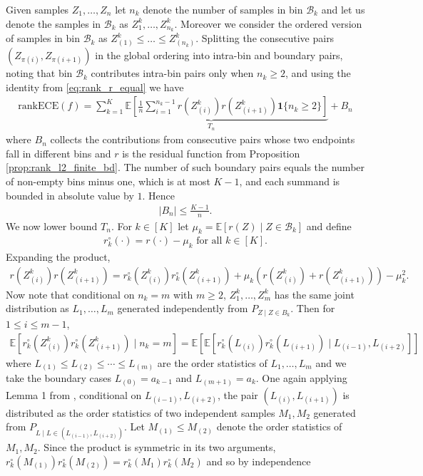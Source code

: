 \documentclass[11pt]{article}
\numberwithin{equation}{section}
\theoremstyle{definition}
\newcommand{\E}{\mathbb{E}}
\newcommand{\cB}{\mathcal{B}}
\newcommand{\one}{\bm{1}}
\newcommand{\rankECE}{\mathrm{rankECE}}
\begin{document}
Given samples $Z_1,\ldots, Z_n$ let $n_k$ denote the number of samples in bin $\cB_k$ and let us denote the samples in $\cB_k$ as $Z_{1}^{k}, \ldots, Z_{n_k}^{k}$. Moreover we consider the ordered version of samples in bin $\cB_k$ as $Z_{(1)}^{k}\leq \ldots\leq Z_{(n_k)}^{k}$. Splitting the consecutive pairs $(Z_{\pi(i)}, Z_{\pi(i+1)})$ in the global ordering into intra-bin and boundary pairs, noting that bin $\cB_k$ contributes intra-bin pairs only when $n_k\geq 2$, and using the identity from \eqref{eq:rank_r_equal} we have
\begin{align*}
    \rankECE(f) = \underbrace{\sum_{k=1}^{K}\E\left[\frac{1}{n}\sum_{i=1}^{n_k-1}r\left(Z_{(i)}^{k}\right)r\left(Z_{(i+1)}^k\right)\one\{n_k\geq 2\}\right]}_{T_n} + B_n
\end{align*}
where $B_n$ collects the contributions from consecutive pairs whose two endpoints fall in different bins and $r$ is the residual function from Proposition \ref{prop:rank_l2_finite_bd}. The number of such boundary pairs equals the number of non-empty bins minus one, which is at most $K-1$, and each summand is bounded in absolute value by $1$. Hence
\begin{align}\label{eq:Bn_bound}
    |B_n|\leq \frac{K-1}{n}.
\end{align}
We now lower bound $T_n$. For $k\in [K]$ let $\mu_k = \E\left[r(Z)\mid Z\in \cB_k\right]$ and define
\begin{align*}
    r_k^\circ(\cdot) = r(\cdot) - \mu_k\text{ for all }k\in [K].
\end{align*}
Expanding the product,
\begin{align}\label{eq:r_prod_expansion}
    r\left(Z_{(i)}^k\right)r\left(Z_{(i+1)}^k\right) = r_k^\circ\left(Z_{(i)}^k\right)r_k^\circ\left(Z_{(i+1)}^k\right) + \mu_k\left(r\left(Z_{(i)}^k\right) + r\left(Z_{(i+1)}^k\right)\right) - \mu_k^2.
\end{align}
Now note that conditional on $n_k = m$ with $m\geq 2$, $Z_1^{k}, \ldots, Z_{m}^{k}$ has the same joint distribution as $L_1,\ldots, L_{m}$ generated independently from $P_{Z\mid Z\in B_k}$. Then for $1\leq i\leq m-1$,
\begin{align*}
    \E\left[r_k^\circ\left(Z_{(i)}^k\right)r_k^\circ\left(Z_{(i+1)}^k\right)\mid n_k = m\right] = \E\left[\E\left[r_k^\circ\left(L_{(i)}\right)r_k^\circ\left(L_{(i+1)}\right)\mid L_{(i-1)}, L_{(i+2)}\right]\right]
\end{align*}
where $L_{(1)}\leq L_{(2)}\leq \cdots\leq L_{(m)}$ are the order statistics of $L_1,\ldots, L_m$ and we take the boundary cases $L_{(0)} = a_{k-1}$ and $L_{(m+1)} = a_{k}$. One again applying Lemma 1 from \cite{gupta2021distribution}, conditional on $L_{(i-1)}, L_{(i+2)}$, the pair $(L_{(i)}, L_{(i+1)})$ is distributed as the order statistics of two independent samples $M_1, M_2$ generated from $P_{L\mid L\in (L_{(i-1)}, L_{(i+2)})}$. Let $M_{(1)}\leq M_{(2)}$ denote the order statistics of $M_1, M_2$. Since the product is symmetric in its two arguments, $r_k^\circ(M_{(1)})r_k^\circ(M_{(2)}) = r_k^\circ(M_1)r_k^\circ(M_2)$ and so by independence
\end{document}
